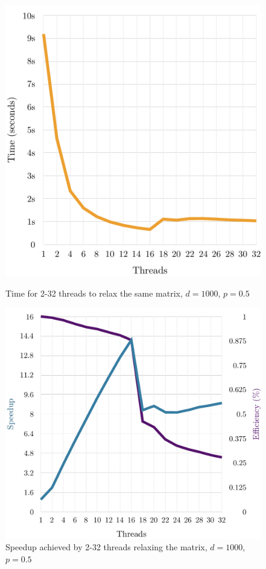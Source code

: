 \documentclass[12pt]{article}
\begin{document}
\begin{figure}[!htb]
    \begin{minipage}{.46\textwidth}
        \hspace{-0.8cm}\includegraphics[width=1.1\textwidth]{img/cliff-threads-time.pdf}
        \centering\caption{Time for 2-32 threads to relax the same matrix, $d=1000$, $p=0.5$}
        \label{fig:clifft}
    \end{minipage}\hspace{0.4cm}
    \begin{minipage}{0.53\textwidth}
       \hspace{-0.8cm}\includegraphics[width=1.1\textwidth]{img/cliff-threads-speedup.pdf}
        \centering\caption{Speedup achieved by 2-32 threads relaxing the matrix, $d=1000$, $p=0.5$}
        \label{fig:cliffs}
    \end{minipage}
\end{figure}
\end{document}
